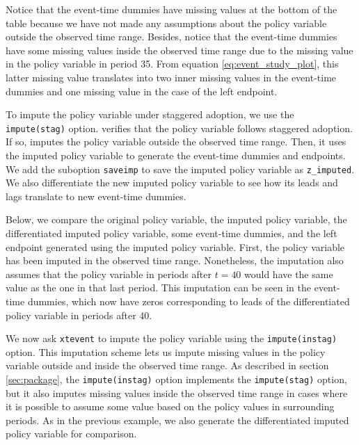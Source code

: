 \documentclass[12pt]{article}
\begin{document}
\begin{stlog}
	\nullskip
\end{stlog}

Notice that the event-time dummies have missing values at the bottom of the table because we have not made any assumptions about the policy variable outside the observed time range.
Besides, notice that the event-time dummies have some missing values inside the observed time range due to the missing value in the policy variable in period 35.
From equation \eqref{eq:event_study_plot}, this latter missing value translates into two inner missing values in the event-time dummies and one missing value in the case of the left endpoint.

To impute the policy variable under staggered adoption, we use the \texttt{impute(stag)} option.
\xtevent verifies that the policy variable follows staggered adoption.
If so, \xtevent imputes the policy variable outside the observed time range.
Then, it uses the imputed policy variable to generate the event-time dummies and endpoints.
We add the suboption \texttt{saveimp} to save the imputed policy variable as \texttt{z\_imputed}.
We also differentiate the new imputed policy variable to see how its leads and lags translate to new event-time dummies.

\begin{stlog}
	\nullskip
\end{stlog}

Below, we compare the original policy variable, the imputed policy variable, the differentiated imputed policy variable, some event-time dummies, and the left endpoint generated using the imputed policy variable.
First, the policy variable has been imputed in the observed time range.
Nonetheless, the imputation also assumes that the policy variable in periods after $t=40$ would have the same value as the one in that last period.
This imputation can be seen in the event-time dummies, which now have zeros corresponding to leads of the differentiated policy variable in periods after 40.

\begin{stlog}
	\nullskip
\end{stlog}

We now ask \texttt{xtevent} to impute the policy variable using the \texttt{impute(instag)} option.
This imputation scheme lets us impute missing values in the policy variable outside and inside the observed time range.
As described in section \ref{sec:package}, the \texttt{impute(instag)} option implements the \texttt{impute(stag)} option, but it also imputes missing values inside the observed time range in cases where it is possible to assume some value based on the policy values in surrounding periods.
As in the previous example, we also generate the differentiated imputed policy variable for comparison.
\end{document}
